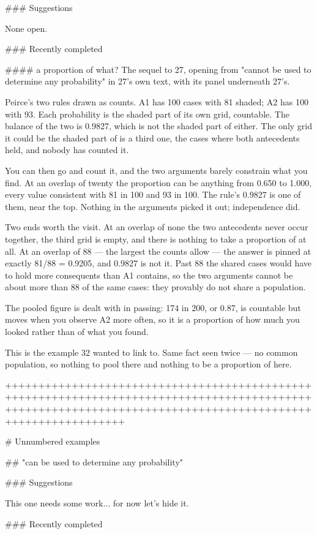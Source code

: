 ### Suggestions

None open.

### Recently completed

#### a proportion of what?
The sequel to 27, opening from "cannot be used to determine any probability" in
27's own text, with its panel underneath 27's.

Peirce's two rules drawn as counts. A1 has 100 cases with 81 shaded; A2 has 100
with 93. Each probability is the shaded part of its own grid, countable. The
balance of the two is 0.9827, which is not the shaded part of either. The only
grid it could be the shaded part of is a third one, the cases where both
antecedents held, and nobody has counted it.

You can then go and count it, and the two arguments barely constrain what you
find. At an overlap of twenty the proportion can be anything from 0.650 to
1.000, every value consistent with 81 in 100 and 93 in 100. The rule's 0.9827 is
one of them, near the top. Nothing in the arguments picked it out; independence
did.

Two ends worth the visit. At an overlap of none the two antecedents never occur
together, the third grid is empty, and there is nothing to take a proportion of
at all. At an overlap of 88 — the largest the counts allow — the answer is
pinned at exactly 81/88 = 0.9205, and 0.9827 is not it. Past 88 the shared cases
would have to hold more consequents than A1 contains, so the two arguments
cannot be about more than 88 of the same cases: they provably do not share a
population.

The pooled figure is dealt with in passing: 174 in 200, or 0.87, is countable
but moves when you observe A2 more often, so it is a proportion of how much you
looked rather than of what you found.

This is the example 32 wanted to link to. Same fact seen twice — no common
population, so nothing to pool there and nothing to be a proportion of here.


++++++++++++++++++++++++++++++++++++++++++++++++++++++++++++++++++++++++++++++++++++++++++++++++++++++++++++++++++++++++++++++++++++++++++++++++++++++++++++

# Unnumbered examples


## "can be used to determine any probability"

### Suggestions

This one needs some work... for now let's hide it.

### Recently completed


